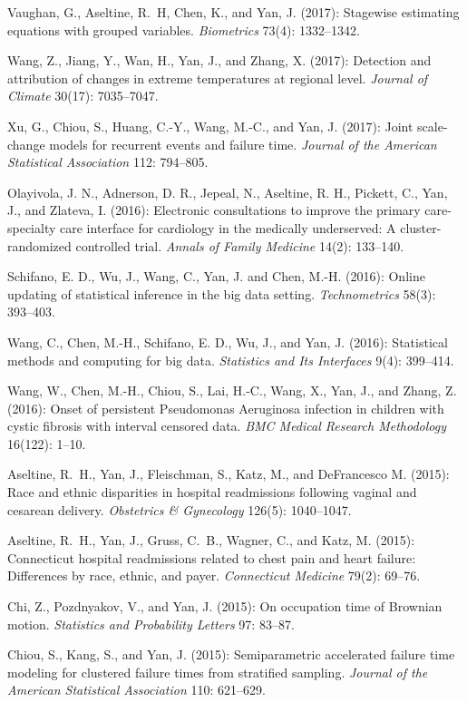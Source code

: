 \documentclass[Statistics]{vita}
\begin{document}
\begin{vita}
\begin{Publications}
\begin{RefereedJournalArticles}
  \item *Vaughan, G., Aseltine, R.~H, Chen, K., and Yan, J. (2017): Stagewise estimating equations with grouped variables. {\em Biometrics\/} 73(4): 1332--1342.
  \item *Wang, Z., Jiang, Y., Wan, H., Yan, J., and Zhang, X. (2017): Detection and attribution of changes in extreme temperatures at regional level.  {\em Journal of Climate\/} 30(17): 7035--7047.
  \item Xu, G., Chiou, S., Huang, C.-Y., Wang, M.-C., and Yan, J. (2017): Joint scale-change models for recurrent events and failure time. {\em Journal of the American Statistical Association\/} 112: 794--805.
  \item Olayivola, J. N., Adnerson, D. R., Jepeal, N., Aseltine, R. H., Pickett, C., Yan, J., and Zlateva, I. (2016): Electronic consultations to improve the primary care-specialty care interface for cardiology in the medically underserved: A cluster-randomized controlled trial. {\em Annals of Family Medicine\/} 14(2): 133--140.
  \item Schifano, E. D., Wu, J., Wang, C., Yan, J. and Chen, M.-H. (2016): Online updating of statistical inference in the big data setting. {\em Technometrics\/} 58(3): 393--403.
  \item *Wang, C., Chen, M.-H., Schifano, E. D., Wu, J., and Yan, J. (2016): Statistical methods and computing for big data. {\em Statistics and Its Interfaces\/} 9(4): 399--414.
  \item *Wang, W., Chen, M.-H., Chiou, S., Lai, H.-C., Wang, X., Yan, J., and Zhang, Z. (2016): Onset of persistent Pseudomonas Aeruginosa infection in children with cystic fibrosis with interval censored data. {\em BMC Medical Research Methodology\/} 16(122): 1--10.
  \item Aseltine, R.~H., Yan, J., Fleischman, S., Katz, M., and DeFrancesco M. (2015): Race and ethnic disparities in hospital readmissions following vaginal and cesarean delivery. {\em Obstetrics \& Gynecology\/} 126(5): 1040--1047.
  \item Aseltine, R.~H., Yan, J., Gruss, C.~B., Wagner, C., and Katz, M. (2015): Connecticut hospital readmissions related to chest pain and heart failure: {D}ifferences by race, ethnic, and payer. {\em Connecticut Medicine\/} 79(2):  69--76.
  \item Chi, Z., Pozdnyakov, V., and Yan, J. (2015): On occupation time of Brownian motion. {\em Statistics and Probability Letters\/} 97: 83--87.
  \item *Chiou, S., Kang, S., and Yan, J. (2015): Semiparametric accelerated failure time modeling for clustered failure times from stratified sampling. {\em Journal of the American Statistical Association\/} 110: 621--629.

\end{RefereedJournalArticles}
\end{Publications}
\end{vita}
\end{document}
